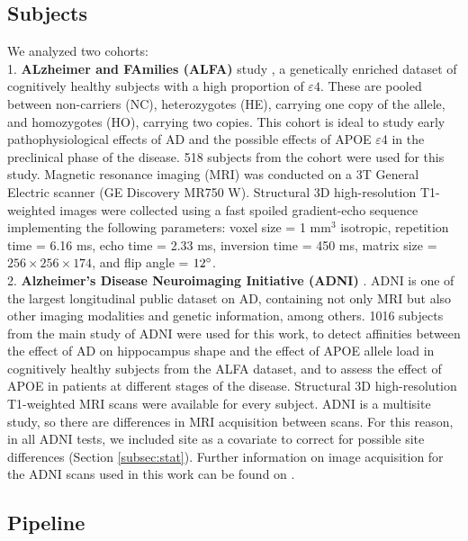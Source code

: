 \subsection{Subjects}

We analyzed two cohorts: \\

1. \textbf{ALzheimer and FAmilies (ALFA)} study \cite{Molinuevo2016}, a genetically enriched dataset of cognitively healthy subjects with a high proportion of $\varepsilon4$. These are pooled between non-carriers (NC), heterozygotes (HE), carrying one copy of the allele, and homozygotes (HO), carrying two copies. This cohort is ideal to study early pathophysiological effects of AD and the possible effects of APOE $\varepsilon$4 in the preclinical phase of the disease. 518 subjects from the cohort were used for this study. Magnetic resonance imaging (MRI) was conducted on a 3T General Electric scanner (GE Discovery MR750 W). Structural 3D high-resolution T1-weighted images were collected using a fast spoiled gradient-echo sequence implementing the following parameters: voxel size = 1 mm$^3$ isotropic, repetition time = 6.16 ms, echo time = 2.33 ms, inversion time = 450 ms, matrix size = $256 \times 256 \times 174$, and flip angle = $12\degree$. \\

2. \textbf{Alzheimer's Disease Neuroimaging Initiative (ADNI)} \cite{Mueller2005}. ADNI is one of the largest longitudinal public dataset on AD, containing not only MRI but also other imaging modalities and genetic information, among others. 1016 subjects from the main study of ADNI were used for this work, to detect affinities between the effect of AD on hippocampus shape and the effect of APOE allele load in cognitively healthy subjects from the ALFA dataset, and to assess the effect of APOE in patients at different stages of the disease. Structural 3D high-resolution T1-weighted MRI scans were available for every subject. ADNI is a multisite study, so there are differences in MRI acquisition between scans. For this reason, in all ADNI tests, we included site as a covariate to correct for possible site differences (Section \ref{subsec:stat}). Further information on image acquisition for the ADNI scans used in this work can be found on \cite{Jack2010a}. \\

\subsection{Pipeline}
\label{sec:pipeline}

